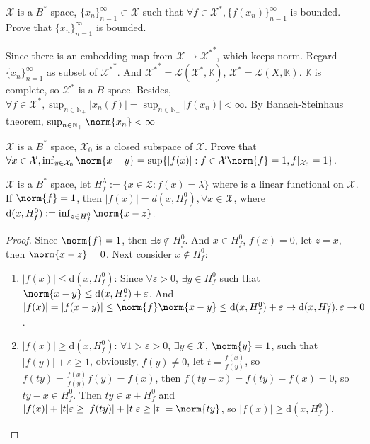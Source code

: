 \documentclass{ctexart}
\begin{document}
\begin{problem}
\(\mathcal{X}\) is a \(B^*\) space, \(\{x_n\}_{n=1}^{\infty} \subset \mathcal{X}\) such that \(\forall f \in \mathcal{X}^*, \{f(x_n)\}_{n=1}^{\infty}\) is bounded.
Prove that \(\{x_n\}_{n=1}^{\infty}\) is bounded.
\end{problem}
\begin{solution}
  Since there is an embedding map from \(\mathcal{X} \to {\mathcal{X}^*}^*\), which keeps norm. Regard \(\{x_n\}_{n=1}^{\infty}\) as subset of \({\mathcal{X}^*}^*\).
  And \({\mathcal{X}^*}^*= \mathcal{L}(\mathcal{X}^*, \mathbb{K})\), \(\mathcal{X}^*=\mathcal{L}(X, \mathbb{K})\). 
  \(\mathbb{K}\) is complete, so \(\mathcal{X}^*\) is a \(B\) space.
  Besides, \(\forall f \in \mathcal{X}^*, \sup_{n \in \mathbb{N}_+} |x_n(f)|=\sup_{n \in \mathbb{N}_+} |f(x_n)|<\infty\).
  By Banach-Steinhaus theorem, \(\sup_{n \in \mathbb{N}_+}\norm{x_n}<\infty \)
\end{solution}
\begin{problem}
\(\mathcal{X}\) is a \(B^*\) space, \(\mathcal{X}_0\) is a closed subspace of \(\mathcal{X}\).
Prove that \(\forall x \in \mathcal{X}, \inf_{y \in \mathcal{X}_0}\norm{x-y}=\sup\{|f(x)|:f \in \mathcal{X} \norm{f}=1, f|_{\mathcal{X}_0}=1\} \).

\end{problem}
\begin{lemma}\label{lem:1}
  \(\mathcal{X}\) is a \(B^*\) space, let \(H_{f}^{\lambda}:=\{x \in \mathcal{Z}: f(x)=\lambda\}\) where is a linear functional on \(\mathcal{X}\). 
  If \(\norm{f}=1\), then \(|f(x)| =  d(x, H_f^0), \forall x \in \mathcal{X}\), where \(\mathrm{d}(x, H_f^0):=\inf_{z \in H_f^0}\norm{x-z}\). 

\end{lemma}
\begin{proof}
  Since \(\norm{f}=1\), then \(\exists z \notin H_f^0\). And \(x \in H_f^0\), \(f(x)=0\), let \(z=x\), then \(\norm{x-z}=0\). Next consider \(x \notin H_f^0\):
  \begin{enumerate} 
    \item \(|f(x)| \leq \mathrm{d}(x, H_f^0)\): Since \(\forall \varepsilon >0\), \(\exists y \in H_f^0\)
      such that \(\norm{x-y} \leq \mathrm{d}(x, H_f^0)+ \varepsilon \). And \(|f(x)|=|f(x-y)| \leq \norm{f}\norm{x-y} \leq \mathrm{d}(x,H_f^0)+ \varepsilon \to \mathrm{d}(x,H_f^0), \varepsilon \to 0\).
    \item \(|f(x)| \geq \mathrm{d}(x, H_f^0)\): \(\forall 1>\varepsilon > 0 \), \(\exists y \in \mathcal{X}\), \(\norm{y} = 1\), such that
      \(|f(y)|+\varepsilon \geq 1\), obviously, \(f(y)\neq 0\), let \(t=\frac{f(x)}{f(y)}\),
      so \(f(ty)=\frac{f(x)}{f(y)}f(y)=f(x)\), then \(f(ty-x)=f(ty)-f(x)=0\), so \(ty-x \in H_f^{0}\).
      Then \(ty \in x + H_f^{0}\) and \(|f(x)|+ |t|\varepsilon \geq 
      |f(ty)|+|t|\varepsilon \geq |t|=\norm{ty}\), so \(|f(x)| \geq \mathrm{d}(x, H_f^{0})\). 


  \end{enumerate}
\end{proof}
\end{document}
